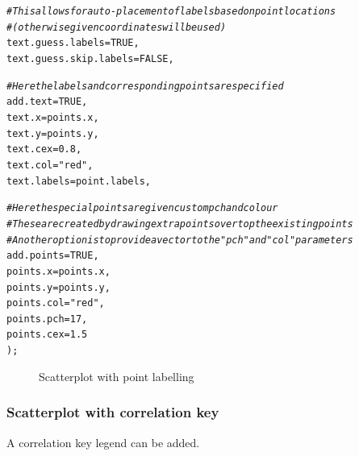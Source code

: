 \documentclass[letterpaper]{article}\usepackage[]{graphicx}\usepackage[]{color}
\makeatletter
\newcommand{\hlnum}[1]{\textcolor[rgb]{0.686,0.059,0.569}{#1}}%
\newcommand{\hlstr}[1]{\textcolor[rgb]{0.192,0.494,0.8}{#1}}%
\newcommand{\hlcom}[1]{\textcolor[rgb]{0.678,0.584,0.686}{\textit{#1}}}%
\newcommand{\hlstd}[1]{\textcolor[rgb]{0.345,0.345,0.345}{#1}}%
\newcommand{\hlkwc}[1]{\textcolor[rgb]{0.333,0.667,0.333}{#1}}%
\newenvironment{kframe}{%
 \def\at@end@of@kframe{}%
 \ifinner\ifhmode%
  \def\at@end@of@kframe{\end{minipage}}%
  \begin{minipage}{\columnwidth}%
 \fi\fi%
 \def\FrameCommand##1{\hskip\@totalleftmargin \hskip-\fboxsep
 \colorbox{shadecolor}{##1}\hskip-\fboxsep
     \hskip-\linewidth \hskip-\@totalleftmargin \hskip\columnwidth}%
 \MakeFramed {\advance\hsize-\width
   \@totalleftmargin\z@ \linewidth\hsize
   \@setminipage}}%
 {\par\unskip\endMakeFramed%
 \at@end@of@kframe}
\newenvironment{knitrout}{}{} %
\makeatother
\begin{document}
\begin{knitrout}
\begin{kframe}
\begin{alltt}
    \hlcom{# This allows for auto-placement of labels based on point locations}
    \hlcom{# (otherwise given coordinates will be used)}
    \hlkwc{text.guess.labels} \hlstd{=} \hlnum{TRUE}\hlstd{,}
    \hlkwc{text.guess.skip.labels} \hlstd{=} \hlnum{FALSE}\hlstd{,}

    \hlcom{# Here the labels and corresponding points are specified}
    \hlkwc{add.text} \hlstd{=} \hlnum{TRUE}\hlstd{,}
    \hlkwc{text.x} \hlstd{= points.x,}
    \hlkwc{text.y} \hlstd{= points.y,}
    \hlkwc{text.cex} \hlstd{=} \hlnum{0.8}\hlstd{,}
    \hlkwc{text.col} \hlstd{=} \hlstr{"red"}\hlstd{,}
    \hlkwc{text.labels} \hlstd{= point.labels,}

    \hlcom{# Here the special points are given custom pch and colour    }
    \hlcom{# These are created by drawing extra points over top the existing points}
    \hlcom{# Another option is to provide a vector to the "pch" and "col" parameters}
    \hlkwc{add.points} \hlstd{=} \hlnum{TRUE}\hlstd{,}
    \hlkwc{points.x} \hlstd{= points.x,}
    \hlkwc{points.y} \hlstd{= points.y,}
    \hlkwc{points.col} \hlstd{=} \hlstr{"red"}\hlstd{,}
    \hlkwc{points.pch} \hlstd{=} \hlnum{17}\hlstd{,}
    \hlkwc{points.cex} \hlstd{=} \hlnum{1.5}
    \hlstd{);}
\end{alltt}
\end{kframe}\begin{figure}[]


{\centering {} 

}

\caption[Scatterplot with point labelling]{Scatterplot with point labelling\label{fig:scatter4}}
\end{figure}


\end{knitrout}

\subsubsection{Scatterplot with correlation key}
A correlation key legend can be added.
\end{document}
